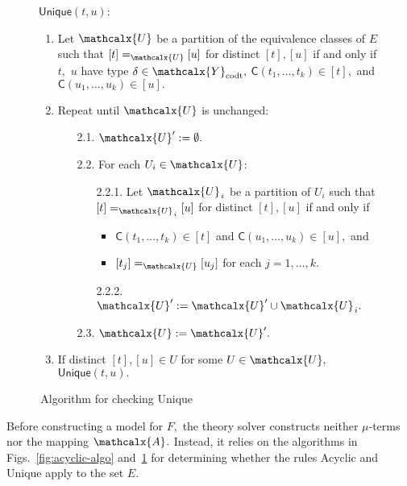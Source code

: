 \documentclass[smallcondensed,draft]{svjour3}
\newcommand\const[1]{\textsf{#1}}
\newcommand{\Ec}{E}
\newcommand{\rn}[1]{\textsf{#1}}
\newcommand{\ec}[1]{[#1]}
\newcommand{\Val}{\mathcalx{A}\vvthinspace}
\newcommand\Types{\mathcalx{Y}}
\newcommand\Codata{\Types_{\mathrm{codt}}}
\newcommand\vvthinspace{\kern+0.041667em}
\newcommand\vthinspace{\kern+0.083333em}
\begin{document}
\begin{figure}[t!]
\normalsize
\centering

\flushleft $\rn{Unique}(t, u)$:

\vspace*{-\topsep}

\begin{enumerate}
\item Let $\mathcalx{U}$ be a partition of the equivalence classes of $\Ec$ such that $\ec{t} =_{\mathcalx{U}} \ec{u}$ for distinct $\ec{t}, \ec{u}$ if and only if
  $t,$ $u$ have type $\delta \in \Codata,$
  $\const{C}( t_1, \ldots, t_k ) \in \ec{t},$
  and $\const{C}( u_1, \ldots, u_k ) \in \ec{u}.$

\item Repeat until $\mathcalx{U}$ is unchanged:
\begin{enumerate}
\item[2.1.] $\mathcalx{U}' := \emptyset.$
\item[2.2.] For each $U_i \in \mathcalx{U}$:
\begin{itemize}
\item[2.2.1.] Let $\mathcalx{U}_{\vthinspace i}$ be a partition of $U_i$ such that $\ec{t} =_{\mathcalx{U}_{\vthinspace i}} \ec{u}$ for distinct $\ec{t}, \ec{u}$ if and only if
\begin{itemize}
\item $\const{C}( t_1, \ldots, t_k ) \in \ec{t}$ and $\const{C}( u_1, \ldots, u_k ) \in \ec{u},$ and
\item $\ec{t_j} =_{\mathcalx{U}} \ec{u_j}$ for each $j = 1, \ldots, k.$
\end{itemize}
\item[2.2.2.] $\mathcalx{U}' := \mathcalx{U}' \cup \mathcalx{U}_{\vthinspace i}.$
\end{itemize}
\item[2.3.] $\mathcalx{U} := \mathcalx{U}'.$
\end{enumerate}
\item If distinct $\ec{t}, \ec{u} \in U$ for some $U \in \mathcalx{U},$ $\rn{Unique}(t,u).$
\end{enumerate}
\vspace*{-\topsep}
\caption{\,Algorithm for checking \rn{Unique}}
\label{fig:uniqueness-algo}
\end{figure}

Before constructing a model for $F\!,$ the theory solver constructs neither $\mu$-terms nor the mapping $\Val.$
Instead, it relies on the algorithms in Figs.~\ref{fig:acyclic-algo} and~\ref{fig:uniqueness-algo}
for determining whether the rules \rn{Acyclic} and \rn{Unique} apply to the set $\Ec.$
\end{document}

